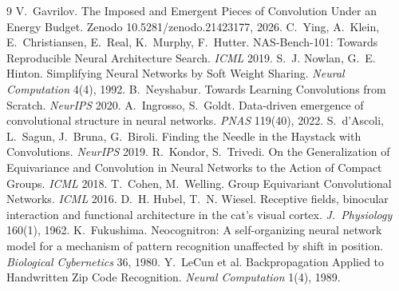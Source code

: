\documentclass[11pt]{article}
\begin{document}
\begin{thebibliography}{9}\setlength{\itemsep}{0pt}\setlength{\parskip}{0pt}
 V.~Gavrilov. The Imposed and Emergent Pieces of Convolution Under an Energy Budget.
 Zenodo 10.5281/zenodo.21423177, 2026.
 C.~Ying, A.~Klein, E.~Christiansen, E.~Real, K.~Murphy, F.~Hutter. NAS-Bench-101:
 Towards Reproducible Neural Architecture Search. \emph{ICML} 2019.
 S.~J. Nowlan, G.~E. Hinton. Simplifying Neural Networks by Soft Weight Sharing.
 \emph{Neural Computation} 4(4), 1992.
 B.~Neyshabur. Towards Learning Convolutions from Scratch. \emph{NeurIPS} 2020.
 A.~Ingrosso, S.~Goldt. Data-driven emergence of convolutional structure in neural
 networks. \emph{PNAS} 119(40), 2022.
 S.~d'Ascoli, L.~Sagun, J.~Bruna, G.~Biroli. Finding the Needle in the Haystack with
 Convolutions. \emph{NeurIPS} 2019.
 R.~Kondor, S.~Trivedi. On the Generalization of Equivariance and Convolution in Neural
 Networks to the Action of Compact Groups. \emph{ICML} 2018.
 T.~Cohen, M.~Welling. Group Equivariant Convolutional Networks. \emph{ICML} 2016.
 D.~H. Hubel, T.~N. Wiesel. Receptive fields, binocular interaction and functional
 architecture in the cat's visual cortex. \emph{J.\ Physiology} 160(1), 1962.
 K.~Fukushima. Neocognitron: A self-organizing neural network model for a mechanism
 of pattern recognition unaffected by shift in position. \emph{Biological Cybernetics} 36, 1980.
 Y.~LeCun et al. Backpropagation Applied to Handwritten Zip Code Recognition.
 \emph{Neural Computation} 1(4), 1989.
\end{thebibliography}
\end{document}
